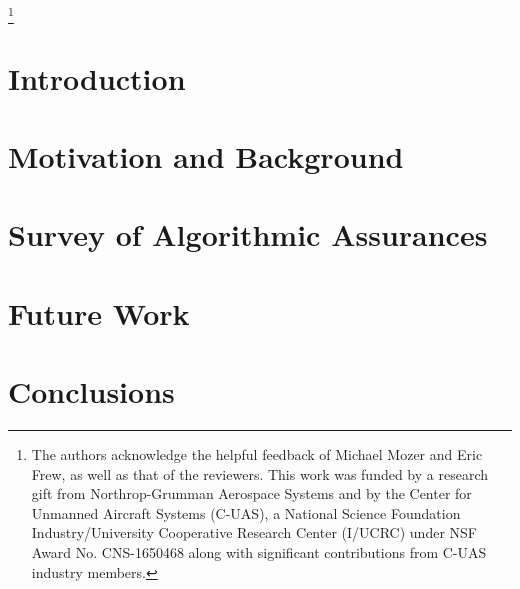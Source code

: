 \documentclass[format=manuscript, screen,review=true]{acmart}
\begin{document}

\thanks{The authors acknowledge the helpful feedback of Michael Mozer and Eric Frew, as well as that of the reviewers. This work was funded by a research gift from Northrop-Grumman Aerospace Systems and by the Center for Unmanned Aircraft Systems (C-UAS), a National Science Foundation Industry/University Cooperative Research Center (I/UCRC) under NSF Award No. CNS-1650468 along with significant contributions from C-UAS industry members.}

\maketitle

\section{Introduction}\label{sec:introduction}


\section{Motivation and Background} \label{sec:background}


\section{Survey of Algorithmic Assurances} \label{sec:synthesis}


\section{Future Work} \label{sec:future_work}


\vspace{-0.1 in}

\section{Conclusions}\label{sec:conclusions}




\end{document}
